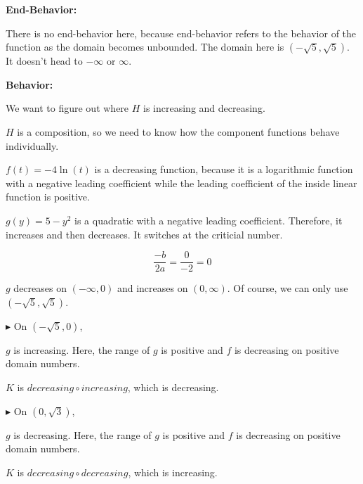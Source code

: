 \documentclass{ximera}
\begin{document}
\textbf{\textcolor{blue!55!black}{End-Behavior:}} 

There is no end-behavior here, because end-behavior refers to the behavior of the function as the domain becomes unbounded.  The domain here is $(-\sqrt{5}, \sqrt{5})$. It doesn't head to $-\infty$ or $\infty$.











\textbf{\textcolor{blue!55!black}{Behavior:}} 


We want to figure out where $H$ is increasing and decreasing. 

$H$ is a composition, so we need to know how the component functions behave individually. 





$f(t) = -4 \ln(t)$ is a decreasing function, because it is a logarithmic function with a negative leading coefficient while the leading coefficient of the inside linear function is  positive. 

$g(y) = 5 - y^2$ is a quadratic with a negative leading coefficient.  Therefore, it increases and then decreases.   It switches at the criticial number.



\[
\frac{-b}{2 a} = \frac{0}{-2} = 0
\]


$g$ decreases on $(-\infty, 0)$ and increases on $(0, \infty)$.  Of course, we can only use $(-\sqrt{5}, \sqrt{5})$.





\textbf{\textcolor{blue!55!black}{$\blacktriangleright$}} On $(-\sqrt{5}, 0)$, 


$g$ is increasing. Here, the range of $g$ is positive and $f$ is decreasing on positive domain numbers.

\begin{center}
$K$ is $decreasing \circ increasing$, which is decreasing. 
\end{center}




\textbf{\textcolor{blue!55!black}{$\blacktriangleright$}} On $(0, \sqrt{3})$, 


$g$ is decreasing. Here, the range of $g$ is positive and $f$ is decreasing on positive domain numbers.


\begin{center}
$K$ is $decreasing \circ decreasing$, which is increasing. 
\end{center}
\end{document}
